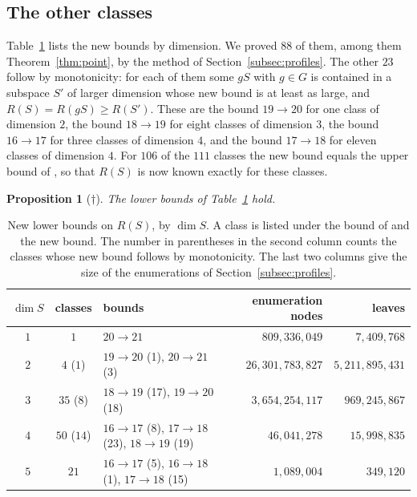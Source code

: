 \documentclass[11pt]{amsart}
\newtheorem{proposition}[theorem]{Proposition}
\theoremstyle{definition}
\theoremstyle{remark}
\numberwithin{equation}{section}
\begin{document}
\subsection{The other classes}
Table~\ref{tab:raise} lists the new bounds by dimension. We proved $88$ of them, among them Theorem~\ref{thm:point}, by the method of Section~\ref{subsec:profiles}. The other $23$ follow by monotonicity: for each of them some $gS$ with $g\in G$ is contained in a subspace $S'$ of larger dimension whose new bound is at least as large, and $R(S)=R(gS)\ge R(S')$. These are the bound $19\to 20$ for one class of dimension $2$, the bound $18\to 19$ for eight classes of dimension $3$, the bound $16\to 17$ for three classes of dimension $4$, and the bound $17\to 18$ for eleven classes of dimension $4$. For $106$ of the $111$ classes the new bound equals the upper bound of \cite{RR26}, so that $R(S)$ is now known exactly for these classes.

\begin{proposition}[$\dagger$]\label{prop:raise}
The lower bounds of Table~\ref{tab:raise} hold.
\end{proposition}

\begin{table}[ht]
\caption{New lower bounds on $R(S)$, by $\dim S$. A class is listed under the bound of \cite{RR26} and the new bound. The number in parentheses in the second column counts the classes whose new bound follows by monotonicity. The last two columns give the size of the enumerations of Section~\ref{subsec:profiles}.}\label{tab:raise}
\centering
\small
\begin{tabular}{@{}ccp{}rr@{}}
\toprule
$\dim S$ & classes & bounds & enumeration nodes & leaves\\
\midrule
$1$ & $1$ & $20\to 21$ & $809{,}336{,}049$ & $7{,}409{,}768$\\
$2$ & $4$ ($1$) & $19\to 20$ (1), $20\to 21$ (3) & $26{,}301{,}783{,}827$ & $5{,}211{,}895{,}431$\\
$3$ & $35$ ($8$) & $18\to 19$ (17), $19\to 20$ (18) & $3{,}654{,}254{,}117$ & $969{,}245{,}867$\\
$4$ & $50$ ($14$) & $16\to 17$ (8), $17\to 18$ (23), $18\to 19$ (19) & $46{,}041{,}278$ & $15{,}998{,}835$\\
$5$ & $21$ & $16\to 17$ (5), $16\to 18$ (1), $17\to 18$ (15) & $1{,}089{,}004$ & $349{,}120$\\
\bottomrule
\end{tabular}
\end{table}
\end{document}
